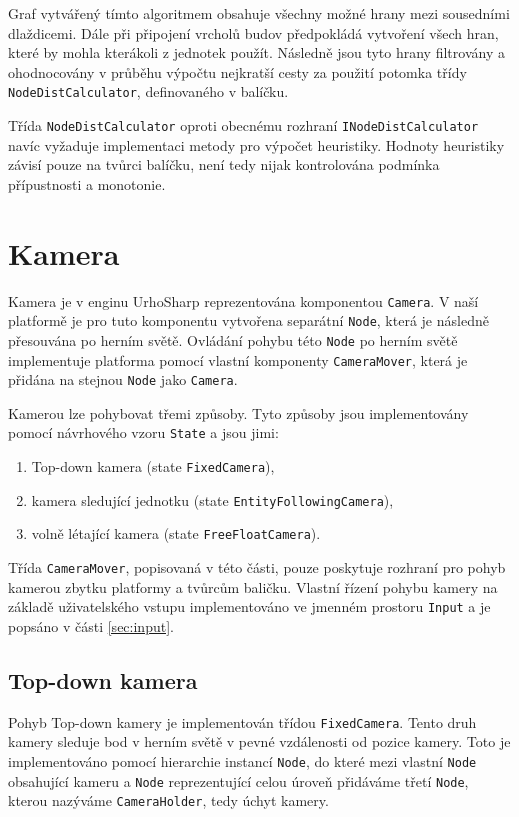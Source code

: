 Graf vytvářený tímto algoritmem obsahuje všechny možné hrany mezi sousedními dlaždicemi. Dále při připojení vrcholů budov předpokládá vytvoření všech hran, které by mohla kterákoli z jednotek použít. Následně jsou tyto hrany filtrovány a ohodnocovány v průběhu výpočtu nejkratší cesty za použití potomka třídy \texttt{NodeDistCalculator}, definovaného v balíčku. 

Třída \texttt{NodeDistCalculator} oproti obecnému rozhraní \texttt{INodeDistCalculator} navíc vyžaduje implementaci metody pro výpočet heuristiky. Hodnoty heuristiky závisí pouze na tvůrci balíčku, není tedy nijak kontrolována podmínka přípustnosti a monotonie.

\section{Kamera}
\label{sec:camera}
Kamera je v enginu UrhoSharp reprezentována komponentou \texttt{Camera}. V naší platformě je pro tuto komponentu vytvořena separátní \texttt{Node}, která je následně přesouvána po herním světě. Ovládání pohybu této \texttt{Node} po herním světě implementuje platforma pomocí vlastní komponenty \texttt{CameraMover}, která je přidána na stejnou \texttt{Node} jako \texttt{Camera}.

Kamerou lze pohybovat třemi způsoby. Tyto způsoby jsou implementovány pomocí návrhového vzoru \texttt{State} a jsou jimi:
\begin{enumerate}
	\item Top-down kamera (state \texttt{FixedCamera}),
	\item kamera sledující jednotku (state \texttt{EntityFollowingCamera}),
	\item volně létající kamera (state \texttt{FreeFloatCamera}).

\end{enumerate}

Třída \texttt{CameraMover}, popisovaná v této části, pouze poskytuje rozhraní pro pohyb kamerou zbytku platformy a tvůrcům baličku. Vlastní řízení pohybu kamery na základě uživatelského vstupu implementováno ve jmenném prostoru \texttt{Input} a je popsáno v části \ref{sec:input}. 

\subsection{Top-down kamera}
Pohyb Top-down kamery je implementován třídou \texttt{FixedCamera}. Tento druh kamery sleduje bod v herním světě v pevné vzdálenosti od pozice kamery. Toto je implementováno pomocí hierarchie instancí \texttt{Node}, do které mezi vlastní \texttt{Node} obsahující kameru a \texttt{Node} reprezentující celou úroveň přidáváme třetí \texttt{Node}, kterou nazýváme \texttt{CameraHolder}, tedy úchyt kamery. 


